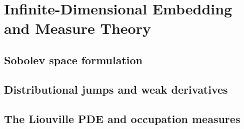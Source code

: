 
\section{Infinite-Dimensional Embedding and Measure Theory}
\label{sec:embedding}

\subsection{Sobolev space formulation}
\label{sub:sobolev_space_formulation}

\subsection{Distributional jumps and weak derivatives}
\label{sub:distributional_jumps_and_weak_derivatives}

\subsection{The Liouville PDE and occupation measures}
\label{sub:liouville_pde_and_occupation_measures}
